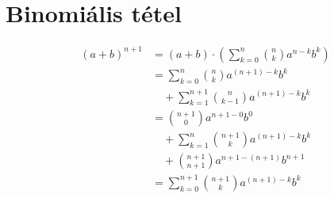 \documentclass{article}
\theoremstyle{remark}
\begin{document}
\section{Binomiális tétel}
\begin{align}
(a + b)^{n+1} &= (a+b) \cdot \left( \sum_{k=0}^n \binom{n}{k} a^{n-k}b^k \right) \\
&= \sum_{k=0}^n \binom{n}{k} a^{(n+1)-k}b^k \\
&\quad+ \sum_{k=1}^{n+1} \binom{n}{k-1} a^{(n+1)-k}b^{k} \\
&= \binom{n+1}{0} a^{n+1-0} b^0 \\
&\quad+ \sum_{k=1}^n \binom{n+1}{k} a^{(n+1)-k}b^k \\
&\quad+ \binom{n+1}{n+1} a^{n+1-(n+1)} b^{n+1} \\
&= \sum_{k=0}^{n+1} \binom{n+1}{k} a^{(n+1)-k}b^k
\end{align}
\end{document}
